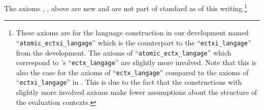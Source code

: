 \documentclass{article}
\begin{document}
The axioms ,
,  above
are new and are not part of standard \Iris{} as of this
writing.\footnote{These axioms are for the language construction in
  our development named ``\texttt{atomic\_ectxi\_langage}'' which is
  the counterpart to the ``\texttt{ectxi\_langage}'' from the \Iris{}
  development. The axioms of ``\texttt{atomic\_ectx\_langage}'' which
  correspond to \Iris{}'s ``\texttt{ectx\_langage}'' are slightly more
  involved. Note that this is also the case for the axioms of
  ``\texttt{ectx\_langage}'' compared to the axioms of
  ``\texttt{ectxi\_langage}'' in \Iris{}. This is due to the fact that
  the constructions with slightly more involved axioms make fewer
  assumptions about the structure of the evaluation contexts.}
\end{document}
